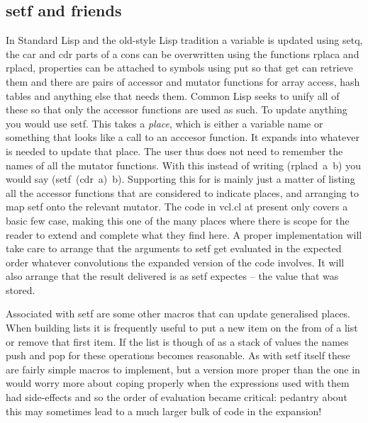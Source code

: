 \subsection{{\tx setf} and friends}
In Standard Lisp and the old-style Lisp tradition a variable is updated
using {\tx setq}, the {\tx car} and {\tx cdr} parts of a {\tx cons} can
be overwritten using the functions {\tx rplaca} and {\tx rplacd}, properties
can be attached to symbols using {\tx put} so that {\tx get} can retrieve
them and there are pairs of accessor and mutator functions for array
access, hash tables and anything else that needs them. Common Lisp seeks to
unify all of these so that only the accessor functions are used as such. To
update anything you would use {\tx setf}. This takes a {\em place}, which is
either a variable name or something that looks like a call to an acccesor
function. It expands into whatever is needed to update that place. The user
thus does not need to remember the names of all the mutator functions. With
this instead of writing {\tx (rplacd~a~b)} you would say
{\tx (setf~(cdr~a)~b)}. Supporting this for \vsl{} is mainly just a matter
of listing all the accessor functions that are considered to indicate places,
and arranging to map {\tx setf} onto the relevant mutator. The code in
{\tx vcl.cl} at present only covers a basic few case, making this one of the
many places where there is scope for the reader to extend and complete what
they find here. A proper implementation will take care to arrange that the
arguments to {\tx setf} get evaluated in the expected order whatever
convolutions the expanded version of the code involves. It will also arrange
that the result delivered is as {\tx setf} expectes -- the value that was
stored.

Associated with {\tx setf} are some other macros that can update generalised
places. When building lists it is frequently useful to put a new item on
the from of a list or remove that first item. If the list is though of as
a stack of values the names {\tx push} and {\tx pop} for these operations
becomes reasonable. As with {\tx setf} itself these are fairly simple macros
to implement, but a version more proper than the one in \vcl{} would
worry more about coping properly when the expressions used with them had
side-effects and so the order of evaluation became critical: pedantry about
this may sometimes lead to a much larger bulk of code in the expansion!

